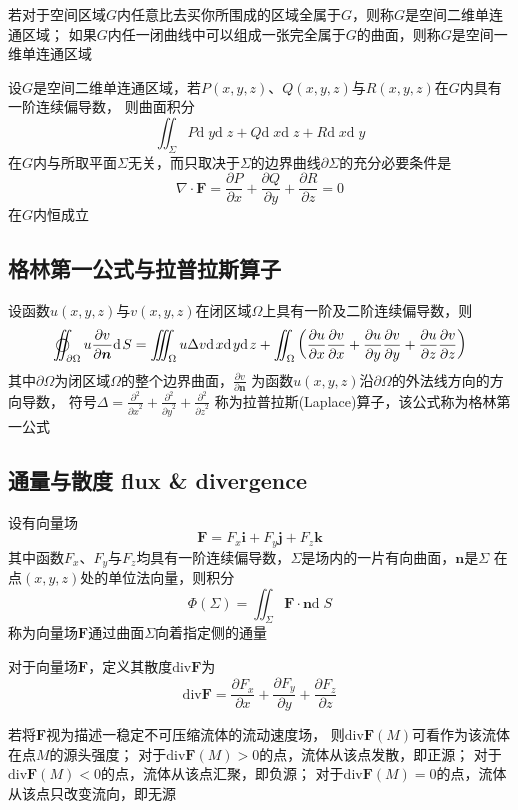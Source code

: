 \documentclass[UTF8]{ctexart}
\newcommand{\dif}[1]{{\mathrm{d}\;\!#1}}
\newcommand{\ve}[1]{{\bm{#1}}}
\newcommand{\emplin}{\vspace{1em}}
\begin{document}
\emplin

若对于空间区域$G$内任意比去买你所围成的区域全属于$G$，则称$G$是空间二维单连通区域；
如果$G$内任一闭曲线中可以组成一张完全属于$G$的曲面，则称$G$是空间一维单连通区域

\emplin

设$G$是空间二维单连通区域，若$P(x,y,z)$、$Q(x,y,z)$与$R(x,y,z)$在$G$内具有一阶连续偏导数，
则曲面积分
\[\iint_\Sigma P\dif{y}\dif{z}+Q\dif{x}\dif{z}+R\dif{x}\dif{y}\]
在$G$内与所取平面$\Sigma$无关，而只取决于$\Sigma$的边界曲线$\partial\Sigma$的充分必要条件是
\[\nabla\cdot\ve{F}=\frac{\partial P}{\partial x}+\frac{\partial Q}{\partial y}+\frac{\partial R}{\partial z}=0\]
在$G$内恒成立

\subsection*{格林第一公式与拉普拉斯算子}
设函数$u(x,y,z)$与$v(x,y,z)$在闭区域$\Omega$上具有一阶及二阶连续偏导数，则
\[\varoiint_{\partial\Omega}u\frac{\partial v}{\partial \ve{n}}\dif{S}=
\iiint_\Omega u\Delta v\dif{x}\dif{y}\dif{z}+
\iint_\Omega\left(
\frac{\partial u}{\partial x}\frac{\partial v}{\partial x}+
\frac{\partial u}{\partial y}\frac{\partial v}{\partial y}+
\frac{\partial u}{\partial z}\frac{\partial v}{\partial z}
\right)\]
其中$\partial\Omega$为闭区域$\Omega$的整个边界曲面，$\frac{\partial v}{\partial \ve{n}}$
为函数$u(x,y,z)$沿$\partial\Omega$的外法线方向的方向导数，
符号$\Delta=\frac{\partial^2}{{\partial x}^2}+\frac{\partial^2}{{\partial y}^2}+\frac{\partial^2}{{\partial z}^2}$
称为拉普拉斯(Laplace)算子，该公式称为格林第一公式

\subsection*{通量与散度 flux \& divergence}
设有向量场
\[\ve{F}=F_x\ve{i}+F_y\ve{j}+F_z\ve{k}\]
其中函数$F_x$、$F_y$与$F_z$均具有一阶连续偏导数，$\Sigma$是场内的一片有向曲面，$\ve{n}$是$\Sigma$
在点$(x,y,z)$处的单位法向量，则积分
\[\Phi(\Sigma)=\iint_\Sigma\ve{F}\cdot\ve{n}\dif{S}\]
称为向量场$\ve{F}$通过曲面$\Sigma$向着指定侧的通量

\emplin

对于向量场$\ve{F}$，定义其散度$\text{div}\ve{F}$为
\[\text{div}\ve{F}=\frac{\partial F_x}{\partial x}+\frac{\partial F_y}{\partial y}+\frac{\partial F_z}{\partial z}\]

若将$\ve{F}$视为描述一稳定不可压缩流体的流动速度场，
则$\text{div}\ve{F}(M)$可看作为该流体在点$M$的源头强度；
对于$\text{div}\ve{F}(M)>0$的点，流体从该点发散，即正源；
对于$\text{div}\ve{F}(M)<0$的点，流体从该点汇聚，即负源；
对于$\text{div}\ve{F}(M)=0$的点，流体从该点只改变流向，即无源
\end{document}
